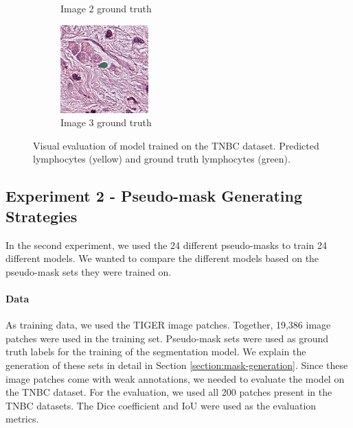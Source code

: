 \begin{figure}[H]
\begin{subfigure}[b]{0.32\textwidth}
    \caption{Image 2 ground truth}
  \end{subfigure}\hfill
  \begin{subfigure}[b]{0.32\textwidth}
    \centering
    \includegraphics[width=\linewidth]{assets/images/for_presentation/exp1-3-gt.png}
    \caption{Image 3 ground truth}
  \end{subfigure}
  \caption{Visual evaluation of model trained on the TNBC dataset. Predicted lymphocytes (yellow) and ground truth lymphocytes (green).}
  \label{fig:exp1-results}
\end{figure}

\subsection{Experiment 2 - Pseudo-mask Generating Strategies}
\label{sub:exp-2}
In the second experiment, we used the 24 different pseudo-masks to train 24 different models. We wanted to compare the different models based on the pseudo-mask sets they were trained on.

\paragraph{Data}
As training data, we used the TIGER image patches. Together, 19,386 image patches were used in the training set. Pseudo-mask sets were used as ground truth labels for the training of the segmentation model. We explain the generation of these sets in detail in Section \ref{section:mask-generation}. Since these image patches come with weak annotations, we needed to evaluate the model on the TNBC dataset. For the evaluation, we used all 200 patches present in the TNBC datasets. The Dice coefficient and IoU were used as the evaluation metrics.

